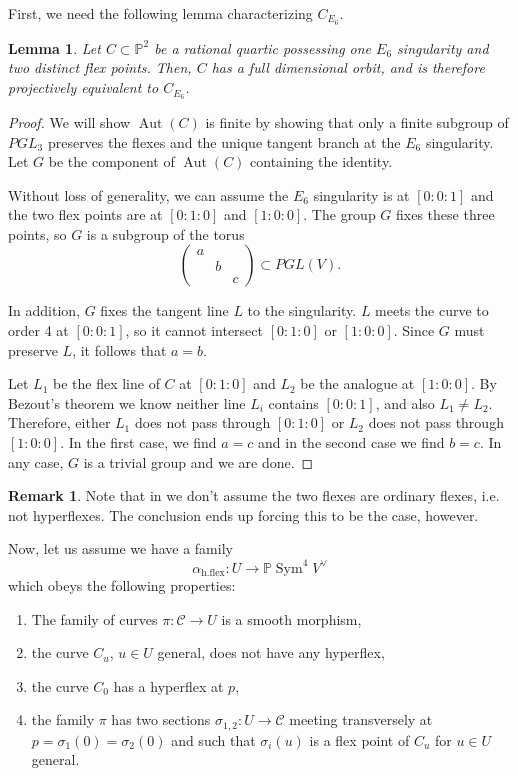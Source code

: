 \documentclass[12 pt, reqno]{amsart}
\newtheorem{lem}[thm]{Lemma}
\theoremstyle{definition}
\newtheorem{rmk}[thm]{Remark}
\newcommand{\on}{\operatorname}
\newcommand{\mb}{\mathbb}
\renewcommand{\P}{\mb{P}}
\begin{document}
First, we need the following lemma characterizing $C_{E_{6}}$.

\begin{lem}
\label{E6}
Let $C \subset\mb{P}^2$ be a rational quartic possessing one $E_6$
singularity and two distinct flex points. Then, $C$ has a full
dimensional orbit, and is therefore projectively equivalent to
$C_{E_6}$.
\end{lem}

\begin{proof}
  We will show $\on{Aut}(C)$ is finite by showing that only a finite
  subgroup of $PGL_3$ preserves the flexes and the unique tangent
  branch at the $E_6$ singularity. Let $G$ be the component of
  $\on{Aut}(C)$ containing the identity.

  Without loss of generality, we can assume the $E_6$ singularity is
  at $[0:0:1]$ and the two flex points are at $[0:1:0]$ and
  $[1:0:0]$. The group $G$ fixes these three points, so $G$ is a
  subgroup of the torus
  \[\begin{pmatrix} a & & \\ & b & \\ & & c\end{pmatrix} \subset
    PGL(V).\]

  In addition, $G$ fixes the tangent line $L$ to the singularity. $L$
  meets the curve to order 4 at $[0:0:1]$, so it cannot intersect
  $[0:1:0]$ or $[1:0:0]$. Since $G$ must preserve $L$, it follows that
  $a=b$.

  Let $L_1$ be the flex line of $C$ at $[0:1:0]$ and $L_2$ be the
  analogue at $[1:0:0]$. By Bezout's theorem we know neither line
  $L_{i}$ contains $[0:0:1]$, and also $L_1\neq L_2$.  Therefore,
  either $L_1$ does not pass through $[0:1:0]$ or $L_2$ does not pass
  through $[1:0:0]$. In the first case, we find $a=c$ and in the
  second case we find $b=c$. In any case, $G$ is a trivial group and
  we are done.
\end{proof}

\begin{rmk}
  Note that in  we don't assume the two flexes are ordinary
  flexes, i.e. not hyperflexes.  The conclusion ends up forcing this
  to be the case, however.
\end{rmk}

Now, let us assume we have a family
\[\alpha_{\on{h.flex}} : U \to \P \on{Sym}^{4}V^{\vee}\] which obeys
the following properties:
\begin{enumerate}
\item The family of curves $\pi: \mathcal{C} \to U$ is a smooth
  morphism,
\item the curve $C_{u}$, $u \in U$ general, does not have any
  hyperflex,
\item the curve $C_{0}$ has a hyperflex at $p$,
\item the family $\pi$ has two sections
  $\sigma_{1,2}: U \to \mathcal{C}$ meeting transversely at
  $p = \sigma_{1}(0) = \sigma_{2}(0)$ and such that $\sigma_{i}(u)$ is
  a flex point of $C_{u}$ for $u \in U$ general.
\end{enumerate}
\end{document}
